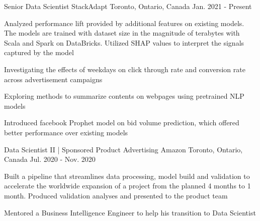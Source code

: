 

\begin{cventries}
\cventry
    {Senior Data Scientist} %
    {StackAdapt} %
    {Toronto, Ontario, Canada} %
    {Jan. 2021 - Present} %
    {
      \begin{cvitems} %
        \item {Analyzed performance lift provided by additional features on existing models. The models are trained with dataset size in the magnitude of terabytes with Scala and Spark on DataBricks. Utilized SHAP values to interpret the signals captured by the model}
        \item {Investigating the effects of weekdays on click through rate and conversion rate across advertisement campaigns}
        \item {Exploring methods to summarize contents on webpages using pretrained NLP models}
        \item {Introduced facebook Prophet model on bid volume prediction, which offered better performance over existing models}
      \end{cvitems}
    }

\end{cventries}


\begin{cventries}
\cventry
    {Data Scientist II | Sponsored Product Advertising} %
    {Amazon} %
    {Toronto, Ontario, Canada} %
    {Jul. 2020 - Nov. 2020} %
    {
      \begin{cvitems} %
        \item {Built a pipeline that streamlines data processing, model build and validation to accelerate the worldwide expansion of a project from the planned 4 months to 1 month. Produced validation analyses and presented to the product team}
        \item {Mentored a Business Intelligence Engineer to help his transition to Data Scientist}
      \end{cvitems}
    }

\end{cventries}


